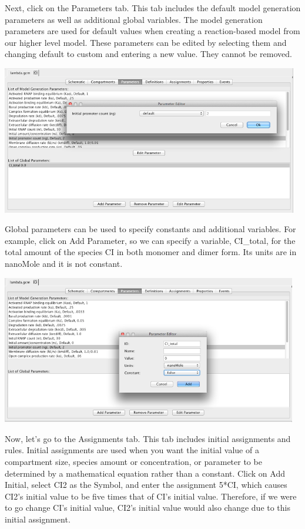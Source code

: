\documentclass[titlepage,11pt]{article}
\begin{document}
Next, click on the Parameters tab.  This tab includes the default model generation parameters as well as additional global variables.  The model generation parameters are used for default values when creating a reaction-based model from our higher level model.  These parameters can be edited by selecting them and changing default to custom and entering a new value.  They cannot be removed.

\begin{center}
\includegraphics[height=65mm]{screenshots/GCMparam}
\end{center}

Global parameters can be used to specify constants and additional variables.  For example, click on Add Parameter, so we can specify a variable, CI\_total, for the total amount of the species CI in both monomer and dimer form.  Its units are in nanoMole and it is not constant.

\begin{center}
\includegraphics[height=65mm]{screenshots/parameter}
\end{center}

Now, let's go to the Assignments tab.  This tab includes initial assignments and rules.  Initial assignments are used when you want the initial value of a compartment size, species amount or concentration, or parameter to be determined by a mathematical equation rather than a constant.  Click on Add Initial, select CI2 as the Symbol, and enter the assignment 5*CI, which causes CI2's initial value to be five times that of CI's initial value.  Therefore, if we were to go change CI's initial value, CI2's initial value would also change due to this initial assignment.
\end{document}
